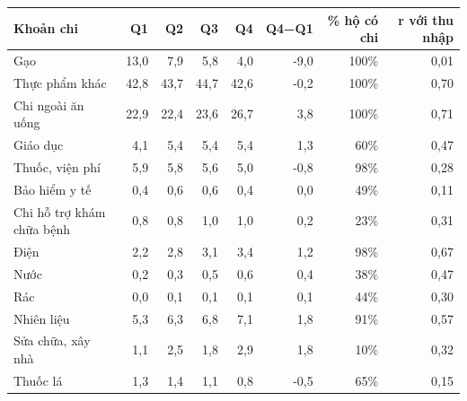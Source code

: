 \begin{tabular}{lrrrrrrr}
\toprule
Khoản chi & Q1 & Q2 & Q3 & Q4 & Q4−Q1 & \% hộ có chi & r với thu nhập \\
\midrule
Gạo & 13,0 & 7,9 & 5,8 & 4,0 & -9,0 & 100\% & 0,01 \\
Thực phẩm khác & 42,8 & 43,7 & 44,7 & 42,6 & -0,2 & 100\% & 0,70 \\
Chi ngoài ăn uống & 22,9 & 22,4 & 23,6 & 26,7 & 3,8 & 100\% & 0,71 \\
Giáo dục & 4,1 & 5,4 & 5,4 & 5,4 & 1,3 & 60\% & 0,47 \\
Thuốc, viện phí & 5,9 & 5,8 & 5,6 & 5,0 & -0,8 & 98\% & 0,28 \\
Bảo hiểm y tế & 0,4 & 0,6 & 0,6 & 0,4 & 0,0 & 49\% & 0,11 \\
Chi hỗ trợ khám chữa bệnh & 0,8 & 0,8 & 1,0 & 1,0 & 0,2 & 23\% & 0,31 \\
Điện & 2,2 & 2,8 & 3,1 & 3,4 & 1,2 & 98\% & 0,67 \\
Nước & 0,2 & 0,3 & 0,5 & 0,6 & 0,4 & 38\% & 0,47 \\
Rác & 0,0 & 0,1 & 0,1 & 0,1 & 0,1 & 44\% & 0,30 \\
Nhiên liệu & 5,3 & 6,3 & 6,8 & 7,1 & 1,8 & 91\% & 0,57 \\
Sửa chữa, xây nhà & 1,1 & 2,5 & 1,8 & 2,9 & 1,8 & 10\% & 0,32 \\
Thuốc lá & 1,3 & 1,4 & 1,1 & 0,8 & -0,5 & 65\% & 0,15 \\
\bottomrule
\end{tabular}
